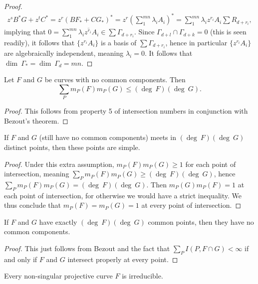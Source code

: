 \begin{proof}
        \begin{align*}
            z^sB^\ast G + z^tC^\ast = z^r(BF_\ast + CG_\ast)^\ast =z^r\left(\sum_1^{mn} \lambda_iA_i\right)^\ast = \sum_1^{mn}\lambda_iz^{r_i}A_i\sum R_{d+r_i},
        \end{align*}
        implying that $0=\sum_1^{mn} \overline{\lambda_iz^{r_i}A_i}\in \sum \Gamma_{d+r_i}.$ Since $\Gamma_{d+l} \cap \Gamma_{d+k} =0$ (this is seen readily), it follows that $\{z^{r_i}A_i\}$ is a basis of $\sum \Gamma_{d+r_i}$, hence in particular $\{z^{r_i}A_i\}$ are algebraically independent, meaning $\lambda_i=0$. It follows that $\dim\ \Gamma_\ast = \dim \ \Gamma_d = mn.$
    \end{proof}
    \begin{corollary}\label{SumOfMultiplicityBound}
        Let $F$ and $G$ be curves with no common components. Then 
        $$\sum_P m_P(F)m_P(G)\leq (\deg \ F)(\deg \ G).$$
    \end{corollary}
    \begin{proof}
        This follows from property 5 of intersection numbers in conjunction with Bezout's theorem. 
    \end{proof}
    \begin{corollary}
        If $F$ and $G$ (still have no common components) meets in $(\deg\ F)(\deg \ G)$ distinct points, then these points are simple. 
    \end{corollary}
    \begin{proof}
        Under this extra assumption, $m_P(F)m_P(G)\geq 1$ for each point of intersection, meaning $\sum_P m_P(F)m_P(G)\geq (\deg \ F)(\deg \ G)$, hence $\sum_P m_P(F)m_P(G) = (\deg \ F)(\deg \ G)$. Then $m_P(G)m_P(F)=1$ at each point of intersection, for otherwise we would have a strict inequality. We thus conclude that $m_P(F)=m_P(G)=1$ at every point of intersection. 
    \end{proof}
    \begin{corollary}
        If $F$ and $G$ have exactly $(\deg \ F)(\deg \ G)$ common points, then they have no common components.
     \end{corollary}
     \begin{proof}
         This just follows from Bezout and the fact that $\sum_P I(P,F\cap G)<\infty$ if and only if $F$ and $G$ intersect properly at every point. 
     \end{proof}
     \begin{proposition}
         Every non-singular projective curve $F$ is irreducible. 
     \end{proposition}
